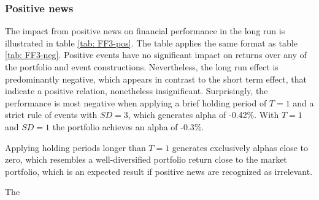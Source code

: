 \subsubsection{Positive news}

The impact from positive news on financial performance in the long run is illustrated in table \ref{tab: FF3-pos}. The table applies the same format as table \ref{tab: FF3-neg}. Positive events have no significant impact on returns over any of the portfolio and event constructions. Nevertheless, the long run effect is predominantly negative, which appears in contrast to the short term effect, that indicate a positive relation, nonetheless insignificant. Surprisingly, the performance is most negative when applying a brief holding period of $T=1$ and a strict rule of events with $SD = 3$, which generates alpha of -0.42\%. With $T=1$ and $SD=1$ the portfolio achieves an alpha of -0.3\%.  

Applying holding periods longer than $T=1$ generates exclusively alphas close to zero, which resembles a well-diversified portfolio return close to the market portfolio, which is an expected result if positive news are recognized as irrelevant. 

The 

